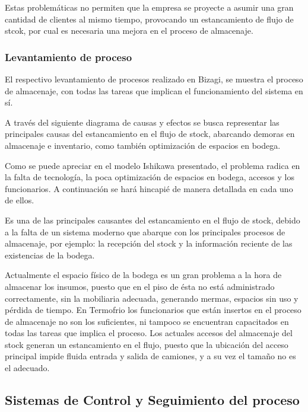 Estas problemáticas no permiten que la empresa se proyecte a asumir una gran cantidad de clientes al mismo tiempo, provocando un estancamiento de flujo de stcok, por cual es necesaria una mejora en el proceso de almacenaje.
    \subsubsection{Levantamiento de proceso}
    El respectivo levantamiento de procesos realizado en Bizagi, se muestra el proceso de almacenaje, con todas las tareas que implican el funcionamiento del sistema en sí.

	A través del siguiente diagrama de causas y efectos se busca representar las
principales causas del estancamiento en el flujo de stock, abarcando demoras en
almacenaje e inventario, como también optimización de espacios en bodega.	


Como se puede apreciar en el modelo Ishikawa presentado, el problema radica en la
falta de tecnología, la poca optimización de espacios en bodega, accesos y los
funcionarios. A continuación se hará hincapié de manera detallada en cada uno de
ellos.

 Es una de las principales causantes del estancamiento en el flujo de stock, debido a la falta de un sistema moderno que abarque con los principales procesos de almacenaje, por ejemplo: la recepción del stock y la información reciente de las existencias de la bodega.

 Actualmente el espacio físico de la bodega es un gran problema a la hora de almacenar los insumos, puesto que en el piso de ésta no está administrado correctamente, sin la mobiliaria adecuada,
generando mermas, espacios sin uso y pérdida de tiempo.
 En Termofrio los funcionarios que están insertos en el proceso de almacenaje no son los suficientes, ni tampoco se encuentran capacitados en todas las tareas que implica el proceso.
 Los actuales accesos del almacenaje del stock generan un estancamiento en el flujo, puesto que la ubicación del acceso principal impide fluida entrada y salida de camiones, y a su vez el tamaño no es el adecuado.

	\subsection{Sistemas de Control y Seguimiento del proceso}
	
